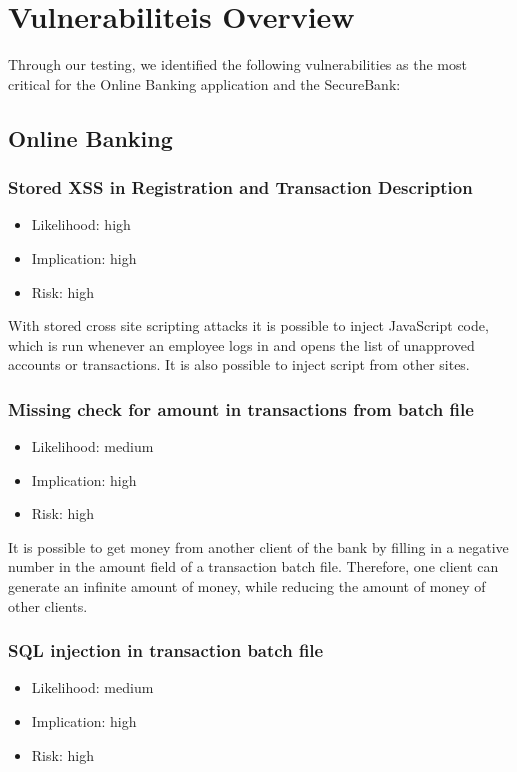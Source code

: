 \chapter{Vulnerabiliteis Overview}\label{chapter:vulnerabilies}

Through our testing, we identified the following vulnerabilities as the most critical for the Online Banking application and the SecureBank:

\section{Online Banking}
\subsection{Stored XSS in Registration and Transaction Description}
\begin{itemize}
	\item Likelihood: high
	\item Implication: high
	\item Risk: high
\end{itemize}

With stored cross site scripting attacks it is possible to inject JavaScript code, which is run whenever an employee logs in and opens the list of unapproved accounts or transactions. It is also possible to inject script from other sites.

\subsection{Missing check for amount in transactions from batch file}
\begin{itemize}
	\item Likelihood: medium
	\item Implication: high
	\item Risk: high
\end{itemize}

It is possible to get money from another client of the bank by filling in a negative number in the amount field of a transaction batch file. Therefore, one client can generate an infinite amount of money, while reducing the amount of money of other clients.

\subsection{SQL injection in transaction batch file}
\begin{itemize}
	\item Likelihood: medium
	\item Implication: high
	\item Risk: high
\end{itemize}

